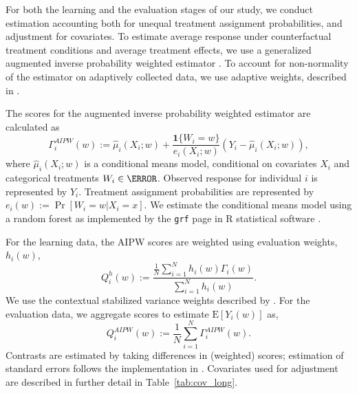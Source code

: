 \documentclass[letterpaper, 12pt, parskip=full,DIV=10]{scrartcl}
\begin{document}

For both the learning and the evaluation stages of our study, we conduct estimation accounting both for unequal treatment assignment probabilities, and adjustment for covariates. To estimate average response under counterfactual treatment conditions and average treatment effects, we use a generalized augmented inverse probability weighted estimator \citep{robins1994estimation}. To account for non-normality of the estimator on adaptively collected data, we use adaptive weights, described in \cite{zhan2021off}. 

The scores for the augmented inverse probability weighted estimator are calculated as
\begin{equation}
\Gamma^{AIPW}_i(w) := \hat \mu_i (X_i; w) + \frac{\textbf{1}\{W_i = w\}}{e_i(X_i;w)}\left(Y_i - \hat\mu_i(X_i;w) \right),
\end{equation}
where $\hat \mu_i (X_i; w)$ is a conditional means model, conditional on covariates $X_i$ and categorical treatments $W_i \in \W$. Observed response for individual $i$ is represented by $Y_i$. Treatment assignment probabilities are represented by $e_i(w):=\Pr[W_i=w\rvert X_i=x]$. We estimate the conditional means model using a random forest as implemented by the \texttt{grf} page in R statistical software \citep{Tibshirani:2020aa}. 

For the learning data, the AIPW scores are weighted using evaluation weights, $h_i(w)$,
\begin{equation}
Q_i^{h}(w) := \frac{ \frac{1}{N}\sum_{i = 1}^N h_i(w)\Gamma_i(w)}{\sum_{i = 1}^N h_i(w)} . 
\label{eq:scores_learning}
\end{equation}
We use the contextual stabilized variance weights described by \cite{zhan2021off}. 
For the evaluation data, we aggregate scores to estimate $\textrm{E}[Y_i(w)]$ as,
\begin{equation}
Q_i^{AIPW}(w) := \frac{1}{N}\sum_{i = 1}^N \Gamma^{AIPW}_i(w). 
\end{equation}
Contrasts are estimated by taking differences in (weighted) scores; estimation of standard errors follows the implementation in \cite{Tibshirani:2020aa}. Covariates used for adjustment are described in further detail in Table~\ref{tab:cov_long}. 
\end{document}
